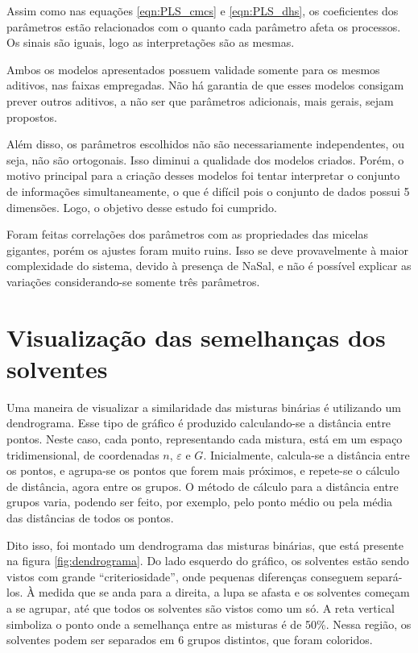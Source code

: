 		Assim como nas equações \ref{eqn:PLS_cmcs} e \ref{eqn:PLS_dhs}, os coeficientes dos parâmetros estão relacionados com o quanto cada parâmetro afeta os processos. Os sinais são iguais, logo as interpretações são as mesmas.
		
		Ambos os modelos apresentados possuem validade somente para os mesmos aditivos, nas faixas empregadas. Não há garantia de que esses modelos consigam prever outros aditivos, a não ser que parâmetros adicionais, mais gerais, sejam propostos.
		
		Além disso, os parâmetros escolhidos não são necessariamente independentes, ou seja, não são ortogonais. Isso diminui a qualidade dos modelos criados. Porém, o motivo principal para a criação desses modelos foi tentar interpretar o conjunto de informações simultaneamente, o que é difícil pois o conjunto de dados possui 5 dimensões. Logo, o objetivo desse estudo foi cumprido.%
		
		Foram feitas correlações dos parâmetros com as propriedades das micelas gigantes, porém os ajustes foram muito ruins. Isso se deve provavelmente à maior complexidade do sistema, devido à presença de NaSal, e não é possível explicar as variações considerando-se somente três parâmetros.
		
		
		\FloatBarrier
		
		\section{Visualização das semelhanças dos solventes}
		
		Uma maneira de visualizar a similaridade das misturas binárias é utilizando um dendrograma. Esse tipo de gráfico é produzido calculando-se a distância entre pontos. Neste caso, cada ponto, representando cada mistura, está em um espaço tridimensional, de coordenadas \(n\), \(\varepsilon\) e \(G\). Inicialmente, calcula-se a distância entre os pontos, e agrupa-se os pontos que forem mais próximos, e repete-se o cálculo de distância, agora entre os grupos. O método de cálculo para a distância entre grupos varia, podendo ser feito, por exemplo, pelo ponto médio ou pela média das distâncias de todos os pontos. %
		
		Dito isso, foi montado um dendrograma das misturas binárias, que está presente na figura \ref{fig:dendrograma}. Do lado esquerdo do gráfico, os solventes estão sendo vistos com grande ``criteriosidade'', onde pequenas diferenças conseguem separá-los. À medida que se anda para a direita, a lupa se afasta e os solventes começam a se agrupar, até que todos os solventes são vistos como um só. A reta vertical simboliza o ponto onde a semelhança entre as misturas é de 50\%. Nessa região, os solventes podem ser separados em 6 grupos distintos, que foram coloridos.
		
